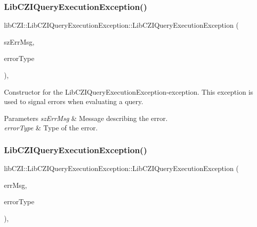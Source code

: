 \subsubsection{\texorpdfstring{Lib\+C\+Z\+I\+Query\+Execution\+Exception()}{LibCZIQueryExecutionException()}\hspace{0.1cm}{\footnotesize\ttfamily [1/2]}}
{\footnotesize\ttfamily lib\+C\+Z\+I\+::\+Lib\+C\+Z\+I\+Query\+Execution\+Exception\+::\+Lib\+C\+Z\+I\+Query\+Execution\+Exception (\begin{DoxyParamCaption}\item[{const char $\ast$}]{sz\+Err\+Msg,  }\item[{\hyperlink{classlib_c_z_i_1_1_lib_c_z_i_query_execution_exception_a7420fe8895248c44d16cf34f23f0c6a2}{Error\+Type}}]{error\+Type }\end{DoxyParamCaption})\hspace{0.3cm}{\ttfamily [inline]}, {\ttfamily [explicit]}}

Constructor for the Lib\+C\+Z\+I\+Query\+Execution\+Exception-\/exception. This exception is used to signal errors when evaluating a query. 
\begin{DoxyParams}{Parameters}
{\em sz\+Err\+Msg} & Message describing the error. \\
\hline
{\em error\+Type} & Type of the error. \\
\hline
\end{DoxyParams}
\mbox{\label{classlib_c_z_i_1_1_lib_c_z_i_query_execution_exception_a15b965e779ae464f4d2b5c1e7948db9a}} 
\subsubsection{\texorpdfstring{Lib\+C\+Z\+I\+Query\+Execution\+Exception()}{LibCZIQueryExecutionException()}\hspace{0.1cm}{\footnotesize\ttfamily [2/2]}}
{\footnotesize\ttfamily lib\+C\+Z\+I\+::\+Lib\+C\+Z\+I\+Query\+Execution\+Exception\+::\+Lib\+C\+Z\+I\+Query\+Execution\+Exception (\begin{DoxyParamCaption}\item[{const std\+::string \&}]{err\+Msg,  }\item[{\hyperlink{classlib_c_z_i_1_1_lib_c_z_i_query_execution_exception_a7420fe8895248c44d16cf34f23f0c6a2}{Error\+Type}}]{error\+Type }\end{DoxyParamCaption})\hspace{0.3cm}{\ttfamily [inline]}, {\ttfamily [explicit]}}

